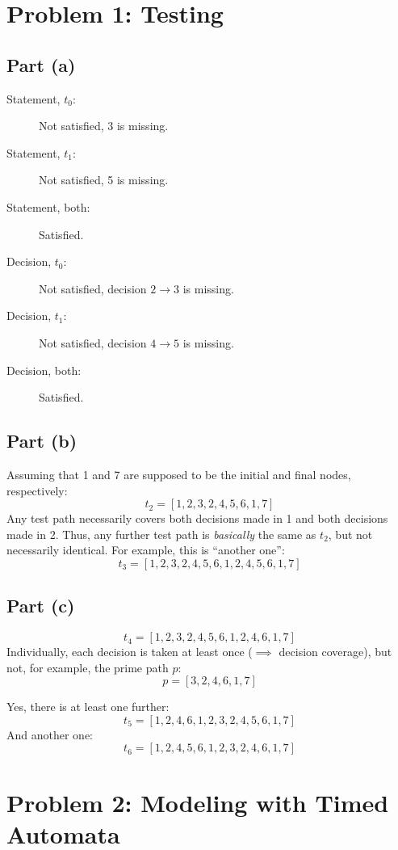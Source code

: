 \documentclass[a4paper,parskip,headheight=38pt]{scrartcl} %
\begin{document}
\section*{Problem 1: Testing}

\subsection*{Part (a)}

\begin{description}
    \item[Statement, $t_0$:] Not satisfied, 3 is missing.
    \item[Statement, $t_1$:] Not satisfied, 5 is missing.
    \item[Statement, both:] Satisfied.
    \item[Decision, $t_0$:] Not satisfied, decision $2 \rightarrow 3$ is missing.
    \item[Decision, $t_1$:] Not satisfied, decision $4 \rightarrow 5$ is missing.
    \item[Decision, both:] Satisfied.
\end{description}

\subsection*{Part (b)}

Assuming that 1 and 7 are supposed to be the initial and final nodes, respectively:
\[ t_2 = [1, 2, 3, 2, 4, 5, 6, 1, 7] \]
Any test path necessarily covers both decisions made in 1 and both
decisions made in 2.  Thus, any further test path is \emph{basically}
the same as $t_2$, but not necessarily identical.  For example, this is
\enquote{another one}:
\[ t_3 = [1, 2, 3, 2, 4, 5, 6, 1, 2, 4, 5, 6, 1, 7] \]

\subsection*{Part (c)}

\[ t_4 = [1, 2, 3, 2, 4, 5, 6, 1, 2, 4, 6, 1, 7] \]
Individually, each decision is taken at least once ($\implies$ decision
coverage), but not, for example, the prime path $p$:
\[ p = [3, 2, 4, 6, 1, 7] \]

Yes, there is at least one further:
\[ t_5 = [1, 2, 4, 6, 1, 2, 3, 2, 4, 5, 6, 1, 7] \]
And another one:
\[ t_6 = [1, 2, 4, 5, 6, 1, 2, 3, 2, 4, 6, 1, 7] \]


\section*{Problem 2: Modeling with Timed Automata}
\end{document}

